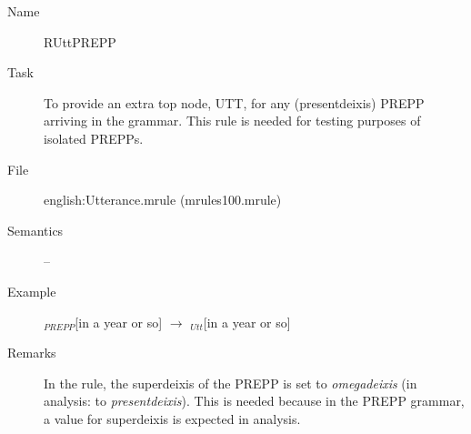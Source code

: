 \begin{description}
\vspace{1 cm}
\begin{description}
\item[Name] RUttPREPP
\item[Task] To provide an extra top node, UTT, for any (presentdeixis)
 PREPP
arriving in the grammar. This rule is needed for testing purposes of isolated 
PREPPs.
\item[File] english:Utterance.mrule (mrules100.mrule)
\item[Semantics] --
\item[Example] $_{PREPP}$[in a year or so] $\rightarrow$ 
$_{Utt}$[in a year or so]
\item[Remarks] In the rule, the superdeixis of the PREPP is set to {\em 
omegadeixis\/} (in analysis: to {\em presentdeixis\/}). This is needed because 
in the PREPP grammar, a value for superdeixis is expected in analysis.
\end{description}


\end{description}



